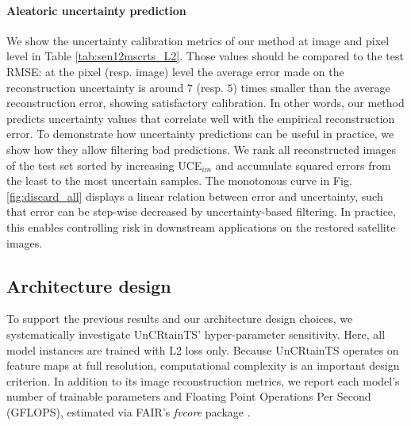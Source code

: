 \documentclass[10pt,twocolumn,letterpaper]{article}
\newcommand{\figref}[1]{ Fig. \ref{#1}}
\newcommand{\tabref}[1]{ Table \ref{#1}}
\begin{document}
\paragraph{\bf Aleatoric uncertainty prediction} We show the uncertainty calibration metrics of our method at image and 
pixel level in\tabref{tab:sen12mscrts_L2}. Those values should be compared to the test RMSE: at the pixel (resp. image) level the average error made on the reconstruction uncertainty is around $7$ (resp. $5$) times smaller than the average reconstruction error, showing satisfactory calibration. In other words, our method predicts uncertainty values that correlate well with the empirical reconstruction error. To demonstrate how uncertainty predictions can be useful in practice, we show how they allow filtering bad predictions.
We rank all reconstructed images of the test set sorted by increasing UCE$_{im}$ and accumulate squared errors from the least to the most uncertain samples.
The monotonous curve in \figref{fig:discard_all} displays a linear relation between error and uncertainty, such that error can be step-wise decreased by uncertainty-based filtering. In practice, this enables controlling risk in downstream applications on the restored satellite images.




\subsection{Architecture design}
To support the previous results and our architecture design choices, we systematically investigate UnCRtainTS' hyper-parameter sensitivity. Here, all model instances are trained with L2 loss only. Because UnCRtainTS operates on feature maps at full resolution, computational complexity is an important design criterion. In addition to its image reconstruction metrics, we report each model's number of trainable parameters and Floating Point Operations Per Second (GFLOPS), estimated via FAIR's \textit{fvcore} package \cite{fvcore}.
\end{document}
